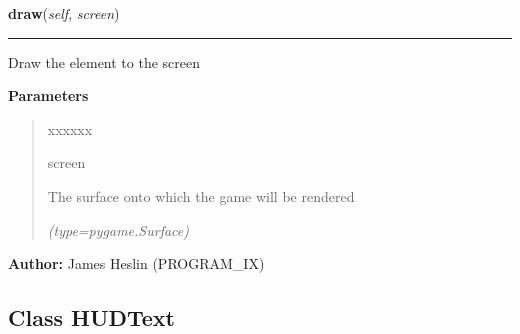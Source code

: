    \label{pystroke:hud:HUDElement:draw}

    \vspace{0.5ex}

\hspace{.8\funcindent}\begin{boxedminipage}{\funcwidth}

    \raggedright \textbf{draw}(\textit{self}, \textit{screen})

    \vspace{-1.5ex}

    \rule{\textwidth}{0.5\fboxrule}
\setlength{\parskip}{2ex}
    Draw the element to the screen

\setlength{\parskip}{1ex}
      \textbf{Parameters}
      \vspace{-1ex}

      \begin{quote}
        \begin{Ventry}{xxxxxx}

          \item[screen]

          The surface onto which the game will be rendered

            {\it (type=pygame.Surface)}

        \end{Ventry}

      \end{quote}

\textbf{Author:} James Heslin (PROGRAM\_IX)



    \end{boxedminipage}



\subsection{Class HUDText}

